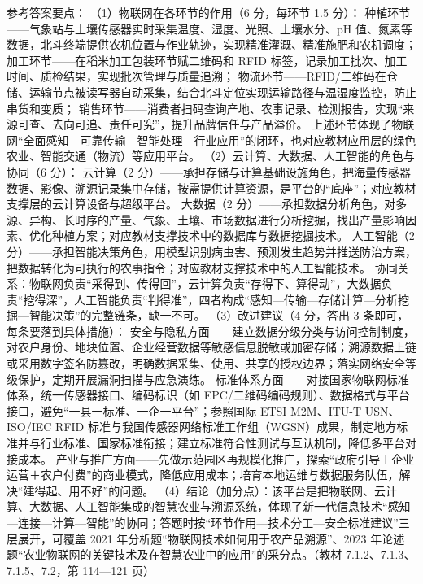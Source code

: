 \documentclass[a4paper,11pt]{article}
\begin{document}

\q 参考答案要点：
（1）物联网在各环节的作用（6 分，每环节 1.5 分）：
种植环节——气象站与土壤传感器实时采集温度、湿度、光照、土壤水分、pH 值、氮素等数据，北斗终端提供农机位置与作业轨迹，实现精准灌溉、精准施肥和农机调度；
加工环节——在稻米加工包装环节赋二维码和 RFID 标签，记录加工批次、加工时间、质检结果，实现批次管理与质量追溯；
物流环节——RFID/二维码在仓储、运输节点被读写器自动采集，结合北斗定位实现运输路径与温湿度监控，防止串货和变质；
销售环节——消费者扫码查询产地、农事记录、检测报告，实现“来源可查、去向可追、责任可究”，提升品牌信任与产品溢价。
上述环节体现了物联网“全面感知—可靠传输—智能处理—行业应用”的闭环，也对应教材应用层的绿色农业、智能交通（物流）等应用平台。
（2）云计算、大数据、人工智能的角色与协同（6 分）：
云计算（2 分）——承担存储与计算基础设施角色，把海量传感器数据、影像、溯源记录集中存储，按需提供计算资源，是平台的“底座”；对应教材支撑层的云计算设备与超级平台。
大数据（2 分）——承担数据分析角色，对多源、异构、长时序的产量、气象、土壤、市场数据进行分析挖掘，找出产量影响因素、优化种植方案；对应教材支撑技术中的数据库与数据挖掘技术。
人工智能（2 分）——承担智能决策角色，用模型识别病虫害、预测发生趋势并推送防治方案，把数据转化为可执行的农事指令；对应教材支撑技术中的人工智能技术。
协同关系：物联网负责“采得到、传得回”，云计算负责“存得下、算得动”，大数据负责“挖得深”，人工智能负责“判得准”，四者构成“感知—传输—存储计算—分析挖掘—智能决策”的完整链条，缺一不可。
（3）改进建议（4 分，答出 3 条即可，每条要落到具体措施）：
安全与隐私方面——建立数据分级分类与访问控制制度，对农户身份、地块位置、企业经营数据等敏感信息脱敏或加密存储；溯源数据上链或采用数字签名防篡改，明确数据采集、使用、共享的授权边界；落实网络安全等级保护，定期开展漏洞扫描与应急演练。
标准体系方面——对接国家物联网标准体系，统一传感器接口、编码标识（如 EPC/二维码编码规则）、数据格式与平台接口，避免“一县一标准、一企一平台”；参照国际 ETSI M2M、ITU-T USN、ISO/IEC RFID 标准与我国传感器网络标准工作组（WGSN）成果，制定地方标准并与行业标准、国家标准衔接；建立标准符合性测试与互认机制，降低多平台对接成本。
产业与推广方面——先做示范园区再规模化推广，探索“政府引导＋企业运营＋农户付费”的商业模式，降低应用成本；培育本地运维与数据服务队伍，解决“建得起、用不好”的问题。
（4）结论（加分点）：该平台是把物联网、云计算、大数据、人工智能集成的智慧农业与溯源系统，体现了新一代信息技术“感知—连接—计算—智能”的协同；答题时按“环节作用—技术分工—安全标准建议”三层展开，可覆盖 2021 年分析题“物联网技术如何用于农产品溯源”、2023 年论述题“农业物联网的关键技术及在智慧农业中的应用”的采分点。（教材 7.1.2、7.1.3、7.1.5、7.2，第 114—121 页）
\end{document}
